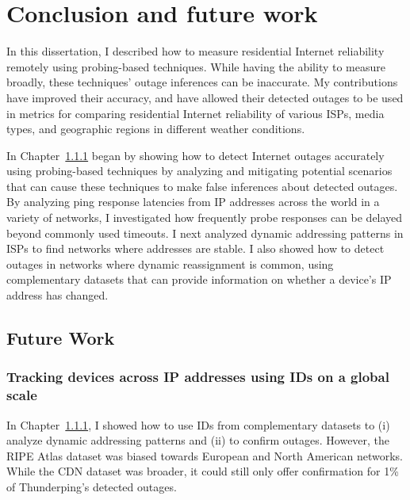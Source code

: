 
\chapter{Conclusion and future work}

In this dissertation, I described how to measure residential Internet
reliability remotely using probing-based techniques. While having the
ability to measure broadly, these techniques' outage inferences can be
inaccurate. My contributions have improved their accuracy, and have
allowed their detected outages to be used in metrics for comparing
residential Internet reliability of various ISPs, media types, and
geographic regions in different weather conditions.

In Chapter~\ref{} began by showing how to detect Internet outages accurately using
probing-based techniques by analyzing and mitigating potential
scenarios that can cause these techniques to make false inferences
about detected outages. By analyzing ping response latencies from IP
addresses across the world in a variety of networks, I investigated
how frequently probe responses can be delayed beyond commonly used
timeouts. I next analyzed dynamic addressing patterns in ISPs to find
networks where addresses are stable. I also showed how to detect
outages in networks where dynamic reassignment is common, using
complementary datasets that can provide information on whether a
device's IP address has changed.


\section{Future Work}

\subsection{Tracking devices across IP addresses using IDs on a global
scale}


In Chapter~\ref{}, I showed how to use IDs from complementary datasets
to (i) analyze dynamic addressing patterns and (ii) to confirm
outages. However, the RIPE Atlas dataset was biased towards European
and North American networks. While the CDN dataset was broader, it
could still only offer confirmation for 1\% of Thunderping's detected outages.

